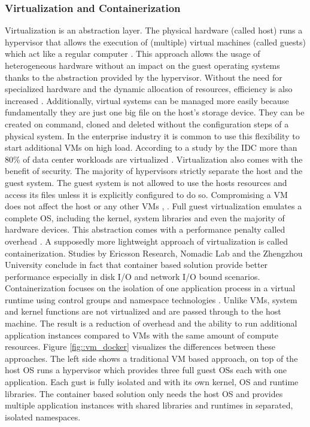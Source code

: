 \documentclass[12pt, a4paper]{article}
\begin{document}
        \subsubsection{Virtualization and Containerization}
        Virtualization is an abstraction layer. The physical hardware (called host) runs a hypervisor that allows the execution of (multiple) virtual machines (called guests) which act like a regular computer \cite{vmbasics}. This approach allows the usage of heterogeneous hardware without an impact on the guest operating systems thanks to the abstraction provided by the hypervisor. Without the need for specialized hardware and the dynamic allocation of resources, efficiency is also increased \cite{redhat_venv}. Additionally, virtual systems can be managed more easily because fundamentally they are just one big file on the host's storage device. They can be created on command, cloned and deleted without the configuration steps of a physical system. In the enterprise industry it is common to use this flexibility to start additional \ac{VM}s on high load. According to a study by the \ac{IDC} more than 80\% of data center workloads are virtualized \cite{virtualaddoption}. Virtualization also comes with the benefit of security. The majority of hypervisors strictly separate the host and the guest system. The guest system is not allowed to use the hosts resources and access its files unless it is explicitly configured to do so. Compromising a \ac{VM} does not affect the host or any other \ac{VM}s \cite{vmbasics}, \cite{redhat_venv}.\newline
        Full guest virtualization emulates a complete \ac{OS}, including the kernel, system libraries and even the majority of hardware devices. This abstraction comes with a performance penalty called overhead \cite{vmbasics}. A supposedly more lightweight approach of virtualization is called containerization. Studies by Ericsson Research, Nomadic Lab \cite{ieee_perfomance} and the Zhengzhou University \cite{zhengzhou_university} conclude in fact that container based solution provide better performance especially in disk \acs{I/O} and network \acs{I/O} bound scenarios. Containerization focuses on the isolation of one application process in a virtual runtime using control groups and namespace technologies \cite{cgroups}. Unlike \ac{VM}s, system and kernel functions are not virtualized and are passed through to the host machine. The result is a reduction of overhead and the ability to run additional application instances compared to \ac{VM}s with the same amount of compute resources. Figure \ref{fig::vm_docker} visualizes the differences between these approaches. The left side shows a traditional \ac{VM} based approach, on top of the host \ac{OS} runs a hypervisor which provides three full guest \acl{OS}s each with one application. Each gust is fully isolated and with its own kernel, \ac{OS} and runtime libraries. The container based solution only needs the host \ac{OS} and provides multiple application instances with shared libraries and runtimes in separated, isolated namespaces.\newline
\end{document}
